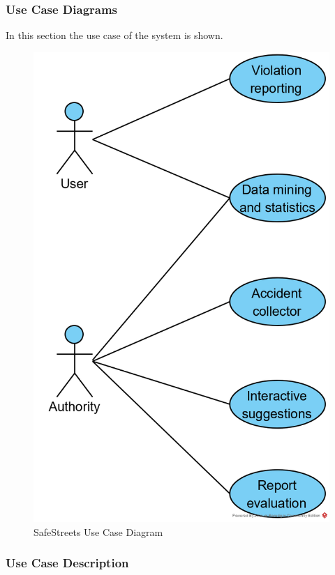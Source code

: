 \documentclass{article}
\begin{document}
			\subsubsection{Use Case Diagrams}
				In this section the use case of the system is shown.
				\begin{figure}[H]
					\centering
					\includegraphics[width=1\textwidth]{diagrams/usecase_safestreets.png}
					\caption[SafeStreets use case diagram]{SafeStreets Use Case Diagram}
					\label{fig:usecase_safestreets}
				\end{figure}
			
			\clearpage
			\subsubsection{Use Case Description}
				
\end{document}
